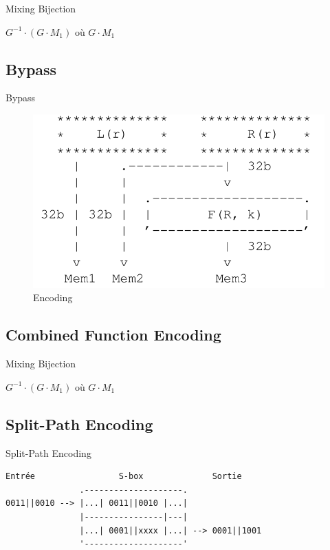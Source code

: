 \documentclass{beamer}
\begin{document}
\begin{frame}{Mixing Bijection}
\begin{center}
$G^{-1} \cdot (G \cdot M_1)$ où $G \cdot M_1$
\end{center}
\end{frame}

\subsection{Bypass}

\begin{frame}{Bypass}
\begin{figure}[h]
\centering
\includegraphics[scale=0.30]{images/bypass.png}
\caption{Encoding}
\end{figure}
\end{frame}

\subsection{Combined Function Encoding}

\begin{frame}{Mixing Bijection}
\begin{center}
$G^{-1} \cdot (G \cdot M_1)$ où $G \cdot M_1$
\end{center}
\end{frame}

\subsection{Split-Path Encoding}

\begin{frame}[fragile]{Split-Path Encoding}
\begin{Verbatim}[samepage=true]
    Entrée                 S-box              Sortie
               .--------------------.
0011||0010 --> |...| 0011||0010 |...|
               |----------------|---|
               |...| 0001||xxxx |...| --> 0001||1001
               '--------------------'
\end{Verbatim}
  
\end{frame}
\end{document}
